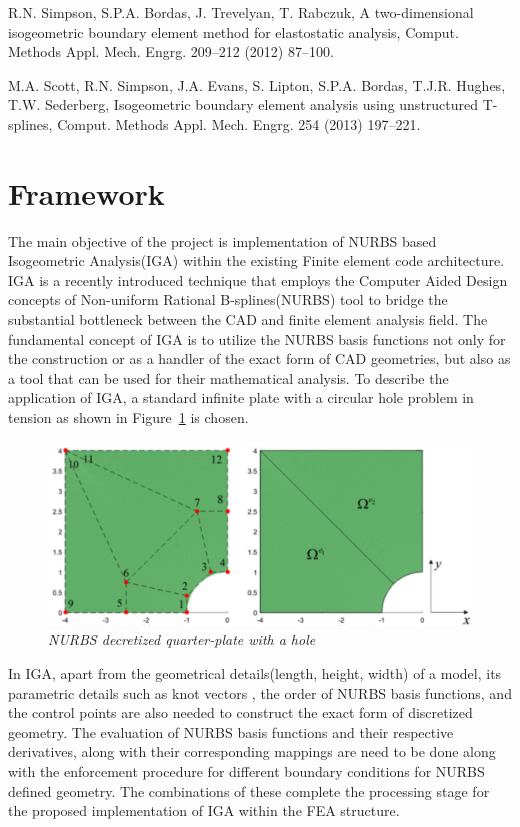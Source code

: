 \documentclass[submit,12pt]{aiaa-pretty} %
\begin{document}
R.N. Simpson, S.P.A. Bordas, J. Trevelyan, T. Rabczuk, A two-dimensional isogeometric boundary element method for elastostatic analysis,
Comput. Methods Appl. Mech. Engrg. 209–212 (2012) 87–100.

M.A. Scott, R.N. Simpson, J.A. Evans, S. Lipton, S.P.A. Bordas, T.J.R. Hughes, T.W. Sederberg, Isogeometric boundary element analysis
using unstructured T-splines, Comput. Methods Appl. Mech. Engrg. 254 (2013) 197–221.

\section{Framework}
The main objective of the project is implementation of NURBS based Isogeometric Analysis(IGA) within the existing Finite element code architecture. IGA is a recently introduced technique that employs the Computer Aided Design concepts of Non-uniform Rational B-splines(NURBS) tool to bridge the substantial  bottleneck between the CAD and finite element analysis field. The fundamental concept of IGA is to utilize the NURBS basis functions not only for the construction or as a handler of the exact form of CAD geometries, but also as a tool that can be used for their mathematical analysis. To describe the application of IGA, a standard infinite plate with a circular hole problem in tension as shown in Figure~\ref{fig:iga-demo} is chosen. 
\begin{figure}[h] 
  \centering
  \includegraphics[width=0.5\linewidth]{iga-demo.pdf}
  \caption{\emph{NURBS decretized quarter-plate with a hole}}
  \label{fig:iga-demo}
\end{figure}
In IGA, apart from the geometrical details(length, height, width) of a
model, its parametric details such as knot vectors , the order of
NURBS basis functions, and the control points are also needed to
construct the exact form of discretized geometry. The evaluation of
NURBS basis functions and their respective derivatives, along with
their corresponding mappings are need to be done along with the
enforcement procedure for different boundary conditions for NURBS
defined geometry. The combinations of these complete the processing
stage for the proposed implementation of IGA within the FEA structure.
\end{document}
